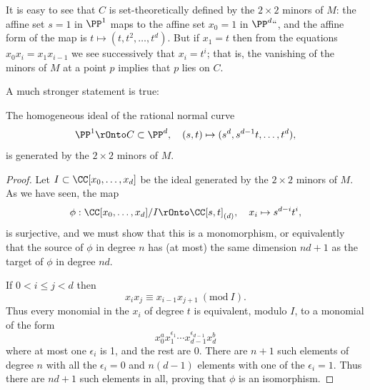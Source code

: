 It is easy to see that $C$ is 
set-theoretically 
%
%
defined by the $2\times 2$ minors of $M$: the affine set $s=1$ in $\PP^1$ maps
to the affine set $x_0 = 1$ in $\PP^d` `$, and the affine form of the map is $t \mapsto (t, t^2, \dots, t^d)$. But if $x_1 = t$ then from 
the equations $x_0x_i = x_1x_{i-1}$ we see successively that $x_i = t^i$; 
that is, the vanishing of the minors of $M$ at a point $p$
implies that $p$ lies on $C$.

A much stronger statement is true:

\begin{proposition}\label{RNC generators} The homogeneous ideal of the
rational normal curve
%
$$
\PP^1 \rOnto C \subset \PP^d,\quad (s,t) \mapsto (s^d, s^{d-1}t, \dots, t^d),
$$ 
 is generated by the
 $2\times 2$ minors of $M$.
  \end{proposition}
  
% 
 
\begin{proof}
Let $I\subset \CC[x_0,\dots, x_d]$ be the ideal generated by the $2\times 2$ minors of $M$.
As we have seen, the map
$$
\phi: \CC[x_0, \dots, x_d]/I \rOnto \CC[s,t]_{(d)},\quad x_i\mapsto s^{d-i}t^i,
$$
is surjective, and we must show that this is a monomorphism, or equivalently that the source of $\phi$ in degree $n$ has
(at most) the same dimension $nd+1$ as the target of $\phi$ in degree $nd$.

If $0<i\leq j<d$ then 
$$
x_ix_j \equiv x_{i-1}x_{j+1}  \ (\mathrm{ mod}\ I).
$$
Thus every monomial in the $x_i$ of degree $t$ is equivalent, modulo $I$, to a monomial of the form
 $$
 x_0^ax_1^{\epsilon_1}\cdots x_{d-1}^{\epsilon_{d-1}}x_d^b
 $$
 where at most one $\epsilon_i$ is 1, and the rest are 0. There are $n+1$ such elements of degree $n$ with all the $\epsilon_i = 0$
 and $n(d-1)$ elements with one of the $\epsilon_i = 1$. Thus there are $nd+1$ such elements in all, proving that $\phi$ is
 an isomorphism.
  \end{proof}

